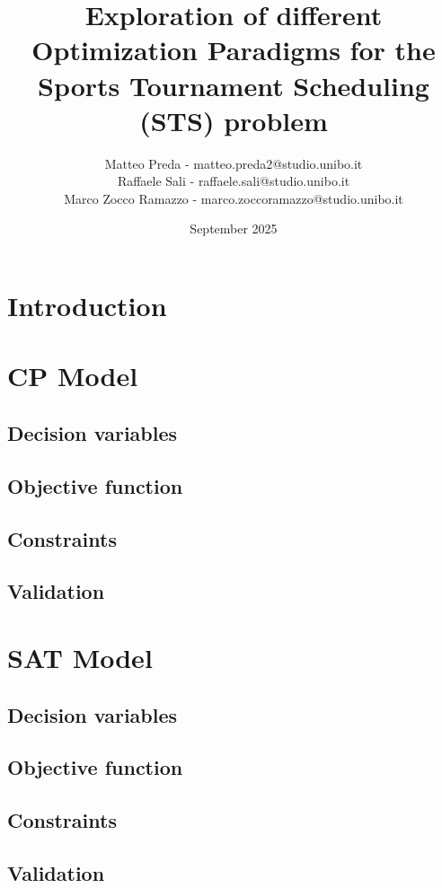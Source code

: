 \documentclass{article}
\title{ \textbf{Exploration of different Optimization Paradigms for the Sports Tournament Scheduling (STS) problem}}
\author{Matteo Preda - matteo.preda2@studio.unibo.it \\ Raffaele Sali - raffaele.sali@studio.unibo.it \\ Marco Zocco Ramazzo - marco.zoccoramazzo@studio.unibo.it}
\date{September 2025}
\begin{document}
\maketitle

\section{Introduction}

\section{CP Model}

\subsection{Decision variables}

\subsection{Objective function}

\subsection{Constraints}

\subsection{Validation}

\section{SAT Model}

\subsection{Decision variables}

\subsection{Objective function}

\subsection{Constraints}

\subsection{Validation}
\end{document}
